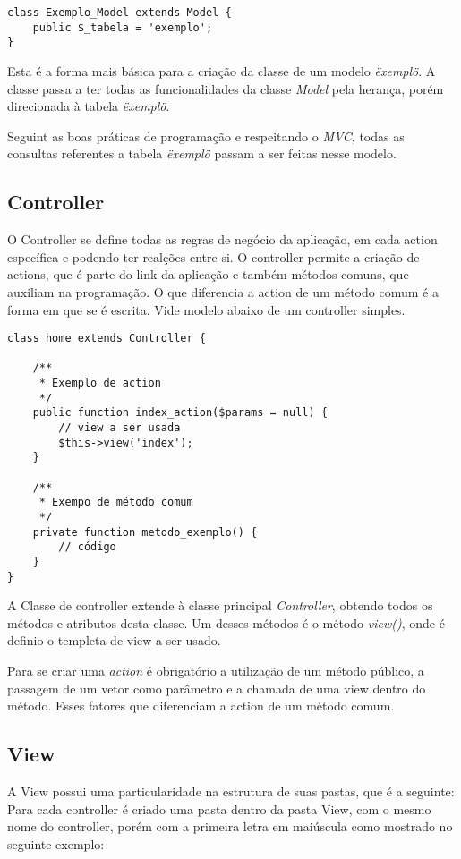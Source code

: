 \begin{lstlisting}
class Exemplo_Model extends Model {
    public $_tabela = 'exemplo';
}
\end{lstlisting}

            Esta é a forma mais básica para a criação da classe de um modelo \emph{\"exemplo\"}. A classe passa a ter todas as funcionalidades da classe \emph{Model} pela herança, porém direcionada à tabela \emph{\"exemplo\"}.

            Seguint as boas práticas de programação e respeitando o \emph{MVC}, todas as consultas referentes a tabela \emph{\"exemplo\"} passam a ser feitas nesse modelo.


        \subsection{Controller\label{sec:app-controller}}
            O Controller se define todas as regras de negócio da aplicação, em cada action específica e podendo ter realções entre si. O controller permite a criação de actions, que é parte do link da aplicação e também métodos comuns, que auxiliam na programação. O que diferencia a action de um método comum é a forma em que se é escrita. Vide modelo abaixo de um controller simples.

\begin{lstlisting}
class home extends Controller {

    /**
     * Exemplo de action
     */
    public function index_action($params = null) {
        // view a ser usada
        $this->view('index');
    }

    /**
     * Exempo de método comum
     */
    private function metodo_exemplo() {
        // código
    }
}
\end{lstlisting}

            A Classe de controller extende à classe principal \emph{Controller}, obtendo todos os métodos e atributos desta classe. Um desses métodos é o método \emph{view()}, onde é definio o templeta de view a ser usado.

            Para se criar uma \emph{action} é obrigatório a utilização de um método público, a passagem de um vetor como parâmetro e a chamada de uma view dentro do método. Esses fatores que diferenciam a action de um método comum.


        \subsection{View\label{sec:app-view}}
            A View possui uma particularidade na estrutura de suas pastas, que é a seguinte: Para cada controller é criado uma pasta dentro da pasta View, com o mesmo nome do controller, porém com a primeira letra em maiúscula como mostrado no seguinte exemplo:

